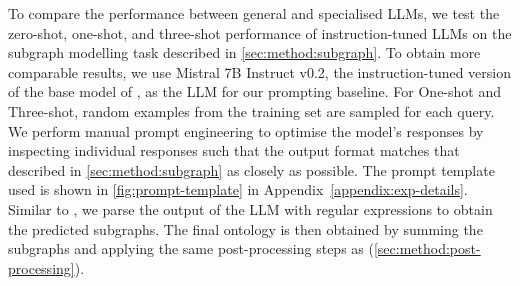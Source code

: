 To compare the performance between general and specialised LLMs, we test the zero-shot, one-shot, and three-shot performance of instruction-tuned LLMs on the subgraph modelling task described in \cref{sec:method:subgraph}. To obtain more comparable results, we use Mistral 7B Instruct v0.2, the instruction-tuned version of the base model of \name, as the LLM for our prompting baseline. For One-shot and Three-shot, random examples from the training set are sampled for each query. We perform manual prompt engineering to optimise the model's responses by inspecting individual responses such that the output format matches that described in \cref{sec:method:subgraph} as closely as possible. The prompt template used is shown in \cref{fig:prompt-template} in Appendix~\ref{appendix:exp-details}. Similar to \name, we parse the output of the LLM with regular expressions to obtain the predicted subgraphs. The final ontology is then obtained by summing the subgraphs and applying the same post-processing steps as \name (\cref{sec:method:post-processing}).
